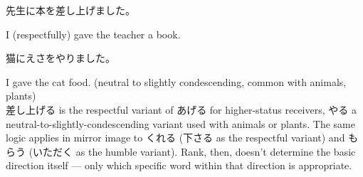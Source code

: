 \documentclass[12pt]{book}
\begin{document}
\par\quad 先生に本を差し上げました。\\
\par\quad I (respectfully) gave the teacher a book.\\

\par\quad 猫にえさをやりました。\\
\par\quad I gave the cat food. (neutral to slightly condescending, common with animals, plants)\\

差し上げる is the respectful variant of あげる for higher-status receivers, やる a neutral-to-slightly-condescending variant used with animals or plants. The same logic applies in mirror image to くれる (下さる as the respectful variant) and もらう (いただく as the humble variant). Rank, then, doesn't determine the basic direction itself — only which specific word within that direction is appropriate.
\end{document}
